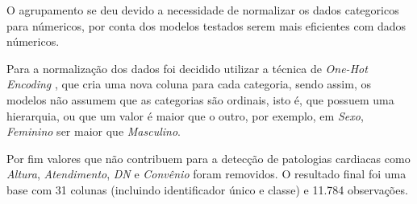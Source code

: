 O agrupamento se deu devido a necessidade de normalizar os dados categoricos para númericos, por conta dos modelos testados serem mais eficientes com dados númericos.

Para a normalização dos dados foi decidido utilizar a técnica de \textit{One-Hot Encoding} \cite{poslavskaya2023encoding}, que cria uma nova coluna para cada categoria, sendo assim, os modelos não assumem que as categorias são ordinais, isto é, que possuem uma hierarquia, ou que um valor é maior que o outro, por exemplo, em \textit{Sexo}, \textit{Feminino} ser maior que \textit{Masculino}.

Por fim valores que não contribuem para a detecção de patologias cardiacas como \textit{Altura}, \textit{Atendimento}, \textit{DN} e \textit{Convênio} foram removidos. O resultado final foi uma base com 31 colunas (incluindo identificador único e classe) e 11.784 observações.


